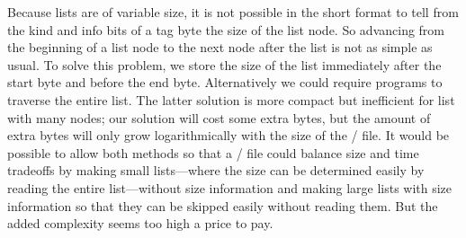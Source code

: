Because lists are of variable size, it is not possible in the short format
to tell from the kind and info bits of a tag byte the size of the list node.
So advancing from the beginning of a list node to the next node after the list is not as
simple as usual.
To solve this problem, we  store the size of the list immediately after
the start byte and before the end byte.
Alternatively we could require programs to traverse the
entire list.
The latter solution is more compact but inefficient for list with many
nodes; our solution will cost some extra bytes, but the amount
of extra bytes will only grow logarithmically with the size of the \HINT/ file.
It would be possible to allow both methods so that a \HINT/ file could balance size
and time tradeoffs by making small lists---where the size can be
determined easily by reading the entire list---without size information and making large lists
with size information so that they can be skipped easily without
reading them. But the added complexity seems too high a price to pay.


